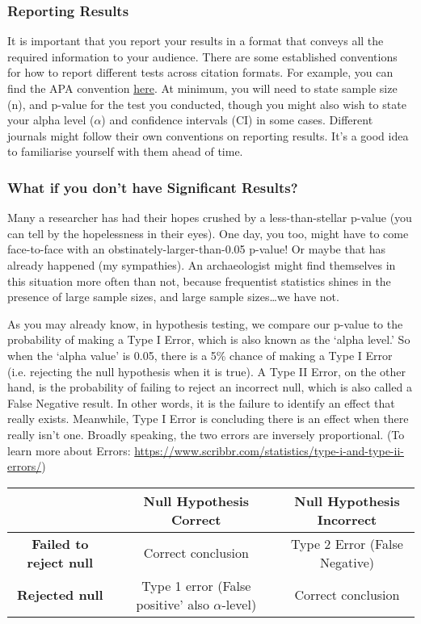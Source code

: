 \documentclass{article}
\begin{document}
\subsubsection{Reporting Results}

It is important that you report your results in a format that conveys all the required information to your audience. There are some established conventions for how to report different tests across citation formats. For example, you can find the APA convention \href{https://psych.uw.edu/storage/writing_center/stats.pdf}{here}. At minimum, you will need to state sample size (n), and p-value for the test you conducted, though you might also wish to state your alpha level ($\alpha$) and confidence intervals (CI) in some cases. Different journals might follow their own conventions on reporting results. It's a good idea to familiarise yourself with them ahead of time.

\subsubsection{What if you don’t have Significant Results?}

Many a researcher has had their hopes crushed by a less-than-stellar p-value (you can tell by the hopelessness in their eyes). One day, you too, might have to come face-to-face with an obstinately-larger-than-0.05 p-value! Or maybe that has already happened (my sympathies). An archaeologist might find themselves in this situation more often than not, because frequentist statistics shines in the presence of large sample sizes, and large sample sizes…we have not. 

As you may already know, in hypothesis testing, we compare our p-value to the probability of making a Type I Error, which is also known as the ‘alpha level.’ So when the ‘alpha value’ is 0.05, there is a 5\% chance of making a Type I Error (i.e. rejecting the null hypothesis when it is true). A Type II Error, on the other hand, is the probability of failing to reject an incorrect null, which is also called a False Negative result. In other words, it is the failure to identify an effect that really exists. Meanwhile, Type I Error is concluding there is an effect when there really isn’t one. Broadly speaking, the two errors are inversely proportional. (To learn more about Errors: \href{https://www.scribbr.com/statistics/type-i-and-type-ii-errors/}{https://www.scribbr.com/statistics/type-i-and-type-ii-errors/}) 

\begin{center}
    \begin{tabular}{|c|c|c|}
    \hline
         & \textbf{Null Hypothesis Correct} & \textbf{Null Hypothesis Incorrect}\\
         \hline
    \textbf{Failed to reject null} & Correct conclusion & Type 2 Error (False Negative)\\
    \hline
    \textbf{Rejected null} & Type 1 error (False positive' also $\alpha$-level) & Correct conclusion\\
    \hline
    \end{tabular}
\end{center}
\end{document}
